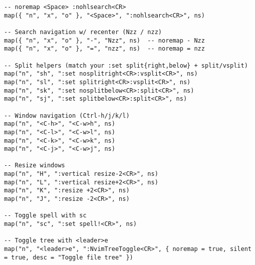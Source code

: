 \begin{lstlisting}
-- noremap <Space> :nohlsearch<CR>
map({ "n", "x", "o" }, "<Space>", ":nohlsearch<CR>", ns)

-- Search navigation w/ recenter (Nzz / nzz)
map({ "n", "x", "o" }, "-", "Nzz", ns)  -- noremap - Nzz
map({ "n", "x", "o" }, "=", "nzz", ns)  -- noremap = nzz

-- Split helpers (match your :set split{right,below} + split/vsplit)
map("n", "sh", ":set nosplitright<CR>:vsplit<CR>", ns)
map("n", "sl", ":set splitright<CR>:vsplit<CR>", ns)
map("n", "sk", ":set nosplitbelow<CR>:split<CR>", ns)
map("n", "sj", ":set splitbelow<CR>:split<CR>", ns)

-- Window navigation (Ctrl-h/j/k/l)
map("n", "<C-h>", "<C-w>h", ns)
map("n", "<C-l>", "<C-w>l", ns)
map("n", "<C-k>", "<C-w>k", ns)
map("n", "<C-j>", "<C-w>j", ns)

-- Resize windows
map("n", "H", ":vertical resize-2<CR>", ns)
map("n", "L", ":vertical resize+2<CR>", ns)
map("n", "K", ":resize +2<CR>", ns)
map("n", "J", ":resize -2<CR>", ns)

-- Toggle spell with sc
map("n", "sc", ":set spell!<CR>", ns)

-- Toggle tree with <leader>e
map("n", "<leader>e", ":NvimTreeToggle<CR>", { noremap = true, silent = true, desc = "Toggle file tree" })

\end{lstlisting}

